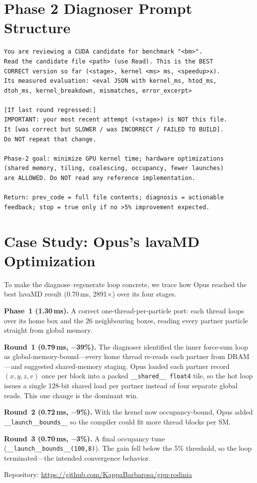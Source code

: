 \documentclass[conference]{IEEEtran}
\begin{document}
\section{Phase 2 Diagnoser Prompt Structure}
\begin{lstlisting}
You are reviewing a CUDA candidate for benchmark "<bm>".
Read the candidate file <path> (use Read). This is the BEST
CORRECT version so far (<stage>, kernel <ms> ms, <speedup>x).
Its measured evaluation: <eval JSON with kernel_ms, htod_ms,
dtoh_ms, kernel_breakdown, mismatches, error_excerpt>

[If last round regressed:]
IMPORTANT: your most recent attempt (<stage>) is NOT this file.
It [was correct but SLOWER / was INCORRECT / FAILED TO BUILD].
Do NOT repeat that change.

Phase-2 goal: minimize GPU kernel time; hardware optimizations
(shared memory, tiling, coalescing, occupancy, fewer launches)
are ALLOWED. Do NOT read any reference implementation.

Return: prev_code = full file contents; diagnosis = actionable
feedback; stop = true only if no >5% improvement expected.
\end{lstlisting}

\section{Case Study: Opus's lavaMD Optimization}

To make the diagnose--regenerate loop concrete, we trace how Opus reached the
best lavaMD result (0.70\,ms, 2891$\times$) over its four stages.

\textbf{Phase~1 (1.30\,ms).} A correct one-thread-per-particle port: each thread
loops over its home box and the 26 neighbouring boxes, reading every partner
particle straight from global memory.

\textbf{Round~1 (0.79\,ms, $-$39\%).} The diagnoser identified the inner
force-sum loop as global-memory-bound---every home thread re-reads each partner
from DRAM---and suggested shared-memory staging. Opus loaded each partner record
$(x,y,z,v)$ once per block into a packed \texttt{\_\_shared\_\_ float4} tile, so
the hot loop issues a single 128-bit shared load per partner instead of four
separate global reads. This one change is the dominant win.

\textbf{Round~2 (0.72\,ms, $-$9\%).} With the kernel now occupancy-bound, Opus
added \texttt{\_\_launch\_\_bounds\_\_} so the compiler could fit more
thread blocks per SM.

\textbf{Round~3 (0.70\,ms, $-$3\%).} A final occupancy tune
(\texttt{\_\_launch\_\_bounds\_\_(100,8)}). The gain fell below the 5\%
threshold, so the loop terminated---the intended convergence behavior.

\vspace{0.5em}
\noindent Repository: \url{https://github.com/KappaBarbarosa/gpu-rodinia}
\end{document}
